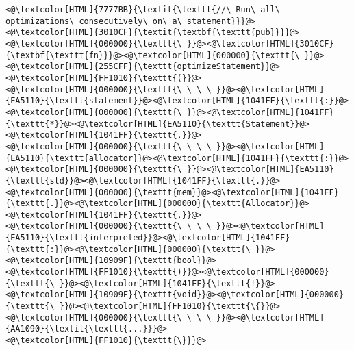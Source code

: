 \begin{lstlisting}
<@\textcolor[HTML]{7777BB}{\textit{\texttt{//\ Run\ all\ optimizations\ consecutively\ on\ a\ statement}}}@>
<@\textcolor[HTML]{3010CF}{\textit{\textbf{\texttt{pub}}}}@><@\textcolor[HTML]{000000}{\texttt{\ }}@><@\textcolor[HTML]{3010CF}{\textbf{\texttt{fn}}}@><@\textcolor[HTML]{000000}{\texttt{\ }}@><@\textcolor[HTML]{255CFF}{\texttt{optimizeStatement}}@><@\textcolor[HTML]{FF1010}{\texttt{(}}@>
<@\textcolor[HTML]{000000}{\texttt{\ \ \ \ }}@><@\textcolor[HTML]{EA5110}{\texttt{statement}}@><@\textcolor[HTML]{1041FF}{\texttt{:}}@><@\textcolor[HTML]{000000}{\texttt{\ }}@><@\textcolor[HTML]{1041FF}{\texttt{*}}@><@\textcolor[HTML]{EA5110}{\texttt{Statement}}@><@\textcolor[HTML]{1041FF}{\texttt{,}}@>
<@\textcolor[HTML]{000000}{\texttt{\ \ \ \ }}@><@\textcolor[HTML]{EA5110}{\texttt{allocator}}@><@\textcolor[HTML]{1041FF}{\texttt{:}}@><@\textcolor[HTML]{000000}{\texttt{\ }}@><@\textcolor[HTML]{EA5110}{\texttt{std}}@><@\textcolor[HTML]{1041FF}{\texttt{.}}@><@\textcolor[HTML]{000000}{\texttt{mem}}@><@\textcolor[HTML]{1041FF}{\texttt{.}}@><@\textcolor[HTML]{000000}{\texttt{Allocator}}@><@\textcolor[HTML]{1041FF}{\texttt{,}}@>
<@\textcolor[HTML]{000000}{\texttt{\ \ \ \ }}@><@\textcolor[HTML]{EA5110}{\texttt{interpreted}}@><@\textcolor[HTML]{1041FF}{\texttt{:}}@><@\textcolor[HTML]{000000}{\texttt{\ }}@><@\textcolor[HTML]{10909F}{\texttt{bool}}@>
<@\textcolor[HTML]{FF1010}{\texttt{)}}@><@\textcolor[HTML]{000000}{\texttt{\ }}@><@\textcolor[HTML]{1041FF}{\texttt{!}}@><@\textcolor[HTML]{10909F}{\texttt{void}}@><@\textcolor[HTML]{000000}{\texttt{\ }}@><@\textcolor[HTML]{FF1010}{\texttt{\{}}@>
<@\textcolor[HTML]{000000}{\texttt{\ \ \ \ }}@><@\textcolor[HTML]{AA1090}{\textit{\texttt{...}}}@>
<@\textcolor[HTML]{FF1010}{\texttt{\}}}@>

\end{lstlisting}